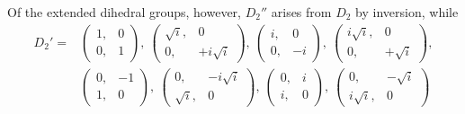 Of the extended dihedral groups, however, $D_2''$ arises from $D_2$ by inversion, while
\[
\begin{aligned}
D_2' = &\begin{pmatrix}1, & 0\\ 0, & 1\end{pmatrix},\ \begin{pmatrix}\sqrt{i}, & 0\\ 0, & +i\sqrt{i}\end{pmatrix},\ \begin{pmatrix}i, & 0\\ 0, & -i\end{pmatrix},\ \begin{pmatrix}i\sqrt{i}, & 0\\ 0, & +\sqrt{i}\end{pmatrix},\\
&\begin{pmatrix}0, & -1\\ 1, & 0\end{pmatrix},\ \begin{pmatrix}0, & -i\sqrt{i}\\ \sqrt{i}, & 0\end{pmatrix},\ \begin{pmatrix}0, & i\\ i, & 0\end{pmatrix},\ \begin{pmatrix}0, & -\sqrt{i}\\ i\sqrt{i}, & 0\end{pmatrix}
\end{aligned}
\]

